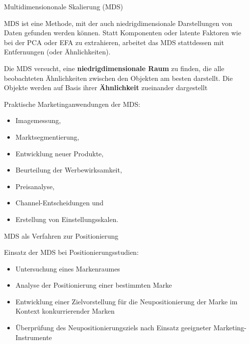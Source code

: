 \documentclass[12pt,ngerman,a4paper,ignorenonframetext,]{beamer}
\providecommand{\tightlist}{%
  \setlength{\itemsep}{0pt}\setlength{\parskip}{0pt}}
\begin{document}
\begin{frame}{Multidimensiononale Skalierung (MDS)}
\protect\hypertarget{multidimensiononale-skalierung-mds}{}

MDS ist eine Methode, mit der auch niedrigdimensionale Darstellungen von
Daten gefunden werden können. Statt Komponenten oder latente Faktoren
wie bei der PCA oder EFA zu extrahieren, arbeitet das MDS stattdessen
mit Entfernungen (oder Ähnlichkeiten).

Die MDS versucht, eine \textbf{niedrigdimensionale Raum} zu finden, die
alle beobachteten Ähnlichkeiten zwischen den Objekten am besten
darstellt. Die Objekte werden auf Basis ihrer \textbf{Ähnlichkeit}
zueinander dargestellt

Praktische Marketinganwendungen der MDS:

\begin{itemize}
\tightlist
\item
  Imagemessung,
\item
  Marktsegmentierung,
\item
  Entwicklung neuer Produkte,
\item
  Beurteilung der Werbewirksamkeit,
\item
  Preisanalyse,
\item
  Channel-Entscheidungen und
\item
  Erstellung von Einstellungsskalen.
\end{itemize}

\end{frame}

\begin{frame}{MDS als Verfahren zur Positionierung}
\protect\hypertarget{mds-als-verfahren-zur-positionierung}{}

Einsatz der MDS bei Positionierungsstudien:

\begin{itemize}
\tightlist
\item
  Untersuchung eines Markenraumes
\item
  Analyse der Positionierung einer bestimmten Marke
\item
  Entwicklung einer Zielvorstellung für die Neupositionierung der Marke
  im Kontext konkurrierender Marken
\item
  Überprüfung des Neupositionierungsziels nach Einsatz geeigneter
  Marketing-Instrumente
\end{itemize}

\end{frame}
\end{document}
